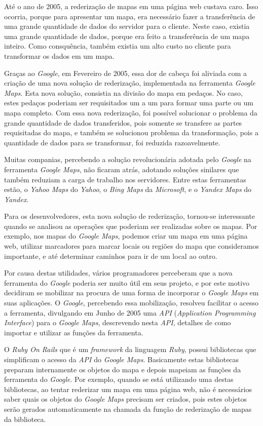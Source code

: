 Até o ano de 2005, a rederização de mapas em uma página web custava caro. Isso ocorria,
porque para apresentar um mapa, era necessário fazer a transferência de uma grande
quantidade de dados do servidor para o cliente. Neste caso, existia uma grande quantidade
de dados, porque era feito a transferência de um mapa inteiro. Como consquência, também
existia um alto custo no cliente para transformar os dados em um mapa.

Graças ao \emph{Google}, em Fevereiro de 2005, essa dor de cabeça foi aliviada com a criação
de uma nova solução de rederização, implementada na ferramenta \emph{Google Maps}. Esta nova
solução, consistia na divisão do mapa em pedaços. No caso, estes pedaços poderiam ser
requisitados um a um para formar uma parte ou um mapa completo. Com essa nova rederização,
foi possível solucionar o problema da grande quantidade de dados transferidos, pois somente
se transfere as partes requisitadas do mapa, e também se solucionou problema da transformação,
pois a quantidade de dados para se transformar, foi reduzida razoavelmente.

Muitas companias, percebendo a solução revolucionária adotada pelo \emph{Google} na
ferramenta \emph{Google Maps}, não ficaram atrás, adotando soluções sinilares que
também reduziam a carga de trabalho nos servidores. Entre estas ferramentas estão, o
\emph{Yahoo Maps} do \emph{Yahoo}, o \emph{Bing Maps} da \emph{Microsoft}, e o
\emph{Yandex Maps} do \emph{Yandex}.

Para os desenvolvedores, esta nova solução de rederização, tornou-se interessante
quando se analisou as operações que poderiam ser realizadas sobre os mapas. Por exemplo, nos mapas
do \emph{Google Maps}, podemos criar um mapa em uma página web, utilizar marcadores para
marcar locais ou regiões do mapa que consideramos importante, e até determinar caminhos
para ir de um local ao outro.

Por causa destas utilidades, vários programadores perceberam que a nova ferramenta do
\emph{Google} poderia ser muito útil em seus projeto, e por este motivo decidiram se mobilizar
na procura de uma forma de incorporar o \emph{Google Maps} em suas aplicações. O
\emph{Google}, percebendo essa mobilização, resolveu facilitar o acesso a ferramenta, divulgando
em Junho de 2005 uma \emph{API} (\emph{Application Programming Interface}) para o
\emph{Google Maps}, descrevendo nesta \emph{API}, detalhes de como importar e utilizar
as funções da ferramenta.

O \emph{Ruby On Rails} que é um \emph{framework} da linguagem \emph{Ruby}, possui
bibliotecas que simplificam o acesso da \emph{API} do \emph{Google Maps}. Basicamente estas
bibliotecas preparam internamente os objetos do mapa e depois mapeiam as funções da
ferramenta do \emph{Google}. Por exemplo, quando se está utilizando uma destas bibliotecas,
ao tentar rederizar um mapa em uma página web, não é necessários saber quais os objetos do
\emph{Google Maps} precisam ser criados, pois estes objetos serão gerados automaticamente
na chamada da função de rederização de mapas da biblioteca.

